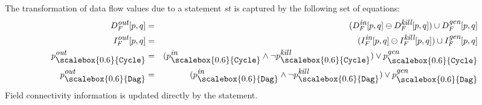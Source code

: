 \documentclass[letterpaper]{sig-alternate}
\newcommand{\p}{\ensuremath{p}}
\newcommand{\q}{\ensuremath{q}}
\newcommand{\subC}{\mbox{\scalebox{0.6}{\Cycle}}}
\newcommand{\subD}{\mbox{\scalebox{0.6}{\Dag}}}
\newcommand{\dout}{\mbox{\footnotesize\em out}}
\newcommand{\din}{\mbox{\footnotesize\em in}}
\newcommand{\dkill}{\mbox{\footnotesize\em kill}}
\newcommand{\dgen}{\mbox{\footnotesize\em gen}}
\newcommand{\remOne}[2]{\ensuremath{#1 \ominus #2}}
\newcommand{\Dag}{{\tt Dag}}
\newcommand{\Cycle}{{\tt Cycle}}
\begin{document}
The transformation of data flow values due to a statement
$st$ is captured by the following set of equations:
\begin{eqnarray*}
  D_F^{\dout}[\p,\q] &=& (\remOne{D_F^{\din}[\p,\q]}{D_F^{\dkill}[\p,\q]}) \cup
  D_F^{\dgen}[\p,\q] \\
  I_F^{\dout}[\p,\q] &=& (\remOne{I_F^{\din}[\p,\q]}{I_F^{\dkill}[\p,\q]}) \cup
  I_F^{\dgen}[\p,\q] \\
  \p_{\subC}^{\dout} &=& (\p_{\subC}^{\din} \wedge
  \neg\p_{\subC}^{\dkill} ) \vee \p_{\subC}^{\dgen}  \\
  \p_{\subD}^{\dout} &=& (\p_{\subD}^{\din} \wedge
  \neg\p_{\subD}^{\dkill} ) \vee \p_{\subD}^{\dgen} 
\end{eqnarray*}
Field connectivity information is updated directly by the
statement. 

\end{document}
